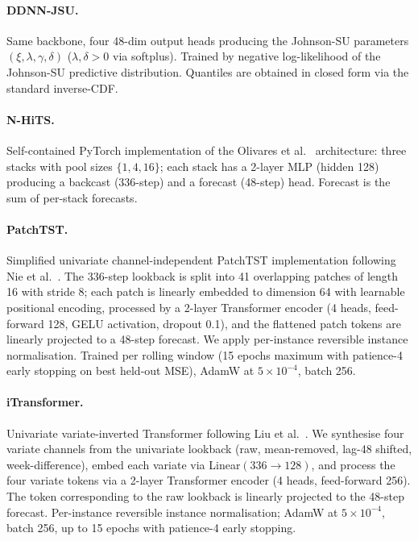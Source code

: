 \documentclass[review,3p,times,authoryear]{elsarticle}
\begin{document}
\paragraph{DDNN-JSU.} Same backbone, four 48-dim output heads producing the Johnson-SU parameters \((\xi, \lambda, \gamma, \delta)\) (\(\lambda, \delta > 0\) via softplus). Trained by negative log-likelihood of the Johnson-SU predictive distribution. Quantiles are obtained in closed form via the standard inverse-CDF.

\paragraph{N-HiTS.} Self-contained PyTorch implementation of the Olivares et al.\ \citep{nhits2023} architecture: three stacks with pool sizes \(\{1, 4, 16\}\); each stack has a 2-layer MLP (hidden 128) producing a backcast (336-step) and a forecast (48-step) head. Forecast is the sum of per-stack forecasts.

\paragraph{PatchTST.} Simplified univariate channel-independent PatchTST implementation following Nie et al.\ \citep{nie2023patchtst}. The 336-step lookback is split into 41 overlapping patches of length 16 with stride 8; each patch is linearly embedded to dimension 64 with learnable positional encoding, processed by a 2-layer Transformer encoder (4 heads, feed-forward 128, GELU activation, dropout 0.1), and the flattened patch tokens are linearly projected to a 48-step forecast. We apply per-instance reversible instance normalisation. Trained per rolling window (15 epochs maximum with patience-4 early stopping on best held-out MSE), AdamW at \(5\times10^{-4}\), batch 256.

\paragraph{iTransformer.} Univariate variate-inverted Transformer following Liu et al.\ \citep{liu2024itransformer}. We synthesise four variate channels from the univariate lookback (raw, mean-removed, lag-48 shifted, week-difference), embed each variate via Linear\((336\to128)\), and process the four variate tokens via a 2-layer Transformer encoder (4 heads, feed-forward 256). The token corresponding to the raw lookback is linearly projected to the 48-step forecast. Per-instance reversible instance normalisation; AdamW at \(5\times10^{-4}\), batch 256, up to 15 epochs with patience-4 early stopping.
\end{document}
